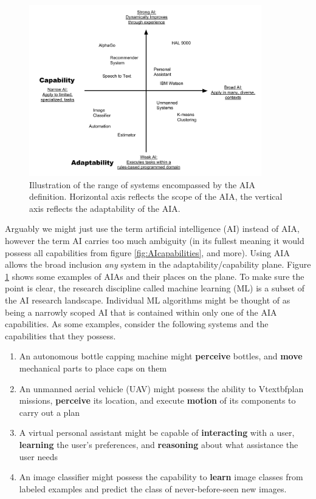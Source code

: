 	\begin{figure}[htbp]
    	\centering
     	\includegraphics[width=0.9\textwidth]{Figures/strong_weak_narrow_broad.pdf}
    	\caption{Illustration of the range of systems encompassed by the AIA definition. Horizontal axis reflects the scope of the AIA, the vertical axis reflects the adaptability of the AIA.}
        \label{fig:StrongWeak}
    \end{figure}

  Arguably we might just use the term artificial intelligence (AI) instead of AIA, however the term AI carries too much ambiguity (in its fullest meaning it would possess all capabilities from figure \ref{fig:AIcapabilities}, and more). Using AIA allows the broad inclusion \emph{any} system in the adaptability/capability plane. Figure \ref{fig:StrongWeak} shows some examples of AIAs and their places on the plane. To make sure the point is clear, the research discipline called machine learning (ML) is a subset of the AI research landscape. Individual ML algorithms might be thought of as being a narrowly scoped AI that is contained within only one of the AIA capabilities. As some examples, consider the following systems and the capabilities that they possess.

    \begin{enumerate}
         \item An autonomous bottle capping machine might \textbf{perceive} bottles, and \textbf{move} mechanical parts to place caps on them
         \item An unmanned aerial vehicle (UAV) might possess the ability to Vtextbf{plan} missions, \textbf{perceive} its location, and execute \textbf{motion} of its components to carry out a plan
         \item A virtual personal assistant might be capable of \textbf{interacting} with a user, \textbf{learning} the user's preferences, and \textbf{reasoning} about what assistance the user needs
         \item An image classifier might possess the capability to \textbf{learn} image classes from labeled examples and predict the class of never-before-seen new images.
     \end{enumerate}

